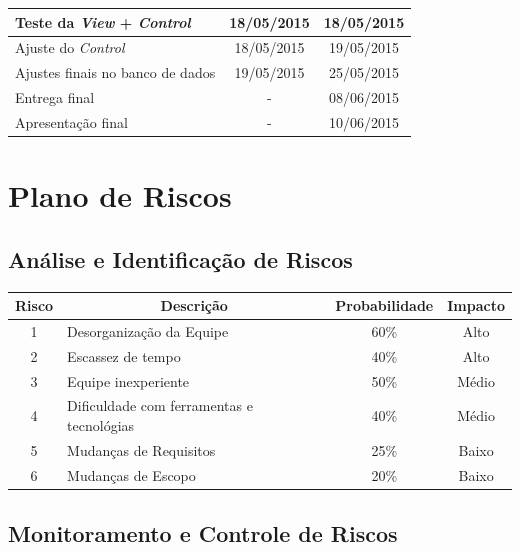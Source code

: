 \documentclass[a4paper,12pt]{article}
\begin{document}
{\begin{longtable}{|l|c|c|}
Teste da \textit{View} + \textit{Control} & 18/05/2015                           & 18/05/2015                        \\ \hline


Ajuste do \textit{Control}                & 18/05/2015                           & 19/05/2015                        \\ \hline


Ajustes finais no banco de dados          & 19/05/2015                           & 25/05/2015                        \\ \hline


Entrega final                             & \multicolumn{1}{c|}{-}               & 08/06/2015                        \\ \hline
Apresentação final                        & \multicolumn{1}{c|}{-}               & 10/06/2015                        \\ \hline
\end{longtable}
}


\newpage
\section{Plano de Riscos}

\subsection{Análise e Identificação de Riscos}

{\normalsize

\begin{longtable}{|c|l|c|c|}
\hline


\multicolumn{1}{|c|}{\textbf{Risco}}  & \multicolumn{1}{c|}{\textbf{Descrição}} & \multicolumn{1}{c|}{\textbf{Probabilidade}} & \multicolumn{1}{c|}{\textbf{Impacto}} \\
\hline
1	& Desorganização da Equipe & 60\% & Alto \\
\hline
2	& Escassez de tempo & 40\% & Alto \\
\hline
3	& Equipe inexperiente	& 50\% & Médio \\
\hline
4	& Dificuldade com ferramentas e tecnológias		& 40\%	& Médio \\
\hline
5	& Mudanças de Requisitos		& 25\%	& Baixo \\
\hline
6	& Mudanças de Escopo		& 20\%	& Baixo \\
\hline
\end{longtable}
}

\subsection{Monitoramento e Controle de Riscos}
\end{document}
